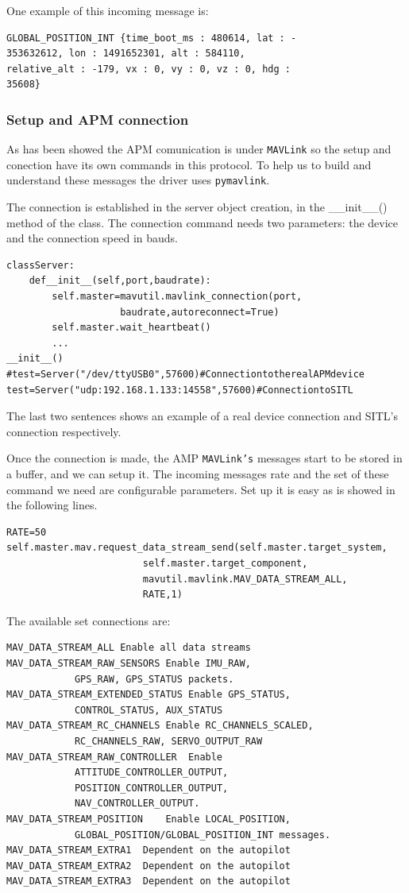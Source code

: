 \documentclass{llncs}
\begin{document}
One example of this incoming message is:
\begin{verbatim}
GLOBAL_POSITION_INT {time_boot_ms : 480614, lat : -
353632612, lon : 1491652301, alt : 584110, 
relative_alt : -179, vx : 0, vy : 0, vz : 0, hdg : 
35608}
\end{verbatim}

\subsubsection{Setup and APM connection}

As has been showed the APM comunication is under \texttt{MAVLink} so the setup and conection have its own commands in this protocol.
To help us to build and understand these messages the driver uses \texttt{pymavlink}.

The connection is established in the server object creation, in the \_\_init\_\_() method of the class. The connection command needs two parameters: the device and the connection speed in bauds.
{\scriptsize
\begin{lstlisting}
classServer:
	def__init__(self,port,baudrate):
		self.master=mavutil.mavlink_connection(port,
					baudrate,autoreconnect=True)
		self.master.wait_heartbeat()
		...
__init__()
#test=Server("/dev/ttyUSB0",57600)#ConnectiontotherealAPMdevice
test=Server("udp:192.168.1.133:14558",57600)#ConnectiontoSITL
\end{lstlisting}}

The last two sentences shows an example of a real device connection and SITL's connection respectively.

Once the connection is made, the AMP \texttt{MAVLink's} messages start to be stored in a buffer, and we can setup it. The incoming messages rate and the set of these command we need are configurable parameters. Set up it is easy as is showed in the following lines.

{\scriptsize
\begin{lstlisting}
RATE=50
self.master.mav.request_data_stream_send(self.master.target_system,
						self.master.target_component,
						mavutil.mavlink.MAV_DATA_STREAM_ALL,
						RATE,1)
\end{lstlisting}}

The available set connections are:

\begin{verbatim}
MAV_DATA_STREAM_ALL	Enable all data streams
MAV_DATA_STREAM_RAW_SENSORS	Enable IMU_RAW, 
	        GPS_RAW, GPS_STATUS packets.
MAV_DATA_STREAM_EXTENDED_STATUS	Enable GPS_STATUS, 
	        CONTROL_STATUS, AUX_STATUS
MAV_DATA_STREAM_RC_CHANNELS	Enable RC_CHANNELS_SCALED,
	        RC_CHANNELS_RAW, SERVO_OUTPUT_RAW
MAV_DATA_STREAM_RAW_CONTROLLER	Enable 
	        ATTITUDE_CONTROLLER_OUTPUT, 
	        POSITION_CONTROLLER_OUTPUT, 
	        NAV_CONTROLLER_OUTPUT.
MAV_DATA_STREAM_POSITION	Enable LOCAL_POSITION, 
	        GLOBAL_POSITION/GLOBAL_POSITION_INT messages.
MAV_DATA_STREAM_EXTRA1	Dependent on the autopilot
MAV_DATA_STREAM_EXTRA2	Dependent on the autopilot
MAV_DATA_STREAM_EXTRA3	Dependent on the autopilot

\end{verbatim}
\end{document}
